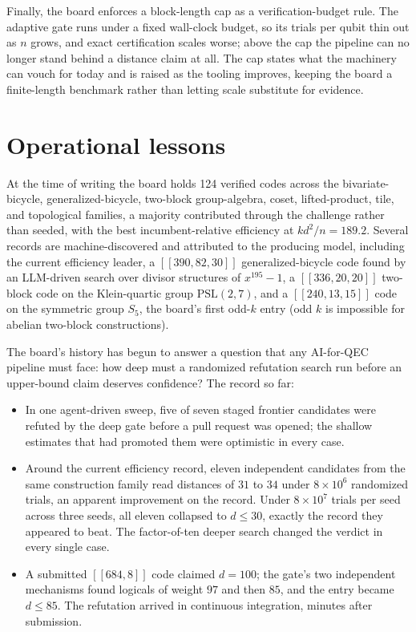 \documentclass{ceurart}
\newcommand{\eff}{kd^2/n}
\begin{document}
Finally, the board enforces a block-length cap as a verification-budget rule.
The adaptive gate runs under a fixed wall-clock budget, so its trials per
qubit thin out as $n$ grows, and exact certification scales worse; above the
cap the pipeline can no longer stand behind a distance claim at all. The cap
states what the machinery can vouch for today and is raised as the tooling
improves, keeping the board a finite-length benchmark rather than
letting scale substitute for evidence.

\section{Operational lessons}
\label{sec:lessons}

At the time of writing the board holds 124 verified codes across the
bivariate-bicycle, generalized-bicycle, two-block group-algebra, coset,
lifted-product, tile, and topological families, a majority contributed
through the challenge rather than seeded, with the best incumbent-relative
efficiency at $\eff = 189.2$. Several records are machine-discovered and
attributed to the producing model, including the current efficiency leader, a
$[[390,82,30]]$ generalized-bicycle code found by an LLM-driven search over
divisor structures of $x^{195}-1$, a $[[336,20,20]]$ two-block code on the
Klein-quartic group $\mathrm{PSL}(2,7)$, and a $[[240,13,15]]$ code on the
symmetric group $S_5$, the board's first odd-$k$ entry (odd $k$ is impossible
for abelian two-block constructions).

The board's history has begun to answer a question that any AI-for-QEC
pipeline must face: how deep must a randomized refutation search run before
an upper-bound claim deserves confidence? The record so far:

\begin{itemize}
    \item In one agent-driven sweep, five of seven staged frontier candidates
    were refuted by the deep gate before a pull request was opened; the
    shallow estimates that had promoted them were optimistic in every case.
    \item Around the current efficiency record, eleven independent candidates
    from the same construction family read distances of $31$ to $34$ under
    $8\times 10^6$ randomized trials, an apparent improvement on the record.
    Under $8\times 10^7$ trials per seed across three seeds, all eleven
    collapsed to $d\le 30$, exactly the record they appeared to beat. The
    factor-of-ten deeper search changed the verdict in every single case.
    \item A submitted $[[684,8]]$ code claimed $d=100$; the gate's two
    independent mechanisms found logicals of weight $97$ and then $85$,
    and the entry became $d\le 85$. The refutation arrived in
    continuous integration, minutes after submission.
\end{itemize}
\end{document}
